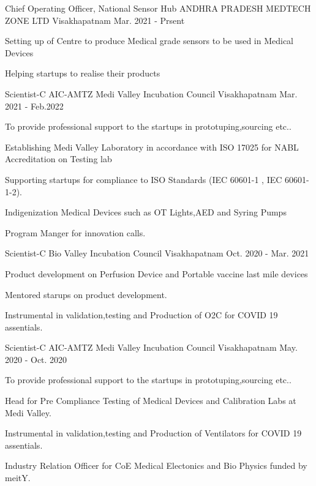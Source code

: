 \begin{cventries}
	
		\cventry
	{Chief Operating Officer, National Sensor Hub}
	{ANDHRA PRADESH MEDTECH ZONE LTD}
	{Visakhapatnam}
	{Mar. 2021 - Prsent}
	{
		\begin{cvitems}
			\item {Setting up of Centre to produce Medical grade sensors to be used in Medical Devices}
			\item { Helping startups to realise their products }
		\end{cvitems}
	}

	\cventry
	{Scientist-C}
	{AIC-AMTZ Medi Valley Incubation Council}
	{Visakhapatnam}
	{Mar. 2021 - Feb.2022}
	{
		\begin{cvitems}
			\item {To provide professional support to the startups in prototuping,sourcing etc..}
			\item { Establishing Medi Valley Laboratory in accordance with ISO 17025 for NABL Accreditation on Testing lab }
			\item {Supporting startups for compliance to ISO Standards (IEC 60601-1 , IEC 60601-1-2).}
			\item {Indigenization Medical Devices such as OT Lights,AED and Syring Pumps}
			\item {Program Manger for innovation calls.}
		\end{cvitems}
	}
	\cventry
	{Scientist-C}
	{Bio Valley Incubation Council}
	{Visakhapatnam}
	{Oct. 2020 - Mar. 2021}
	{
		\begin{cvitems}
			\item { Product development on Perfusion Device and Portable vaccine last mile devices}
			\item {Mentored starups on product development.}
			\item {Instrumental in validation,testing and Production of O2C for COVID 19 assentials.}
		\end{cvitems}
	}

	\cventry
	{Scientist-C}
	{AIC-AMTZ Medi Valley Incubation Council}
	{Visakhapatnam}
	{May. 2020 - Oct. 2020}
	{
		\begin{cvitems}
			\item {To provide professional support to the startups in prototuping,sourcing etc..}			
			\item {Head for Pre Compliance Testing of Medical Devices and Calibration Labs at Medi Valley.}	
			\item {Instrumental in validation,testing and Production of Ventilators for COVID 19 assentials.}
			\item {Industry Relation Officer for CoE Medical Electonics and Bio Physics funded by meitY.}
		\end{cvitems}
	}



\end{cventries}
